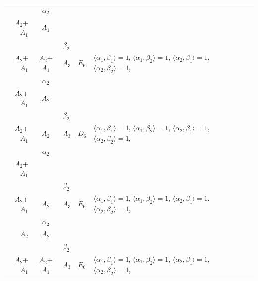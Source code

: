 \documentclass[12pt]{report}
\begin{document}
\begin{appendix}
{\begin{longtable}{rcl p{1cm}p{1cm}p{3cm} }
\\
\begin{tabular}{cc}$\alpha_1$+ & $\alpha_2$\\\tiny{ $A_2$+$A_1$ } & \tiny{ $A_1$ }\end{tabular} &\begin{tabular}{c} = \\~ \end{tabular} & \begin{tabular}{cc}$\beta_1$+ & $\beta_2$\\\tiny{ $A_2$+$A_1$ } & \tiny{ $A_2$+$A_1$ }\end{tabular} & $A_3$ & $E_6$ &  $\langle\alpha_1, \beta_1\rangle=1$, $\langle\alpha_1, \beta_2\rangle=1$, $\langle\alpha_2, \beta_1\rangle=1$, $\langle\alpha_2, \beta_2\rangle=1$, 
\\
\begin{tabular}{cc}$\alpha_1$+ & $\alpha_2$\\\tiny{ $A_2$+$A_1$ } & \tiny{ $A_2$ }\end{tabular} &\begin{tabular}{c} = \\~ \end{tabular} & \begin{tabular}{cc}$\beta_1$+ & $\beta_2$\\\tiny{ $A_2$+$A_1$ } & \tiny{ $A_2$ }\end{tabular} & $A_3$ & $D_6$ &  $\langle\alpha_1, \beta_1\rangle=1$, $\langle\alpha_1, \beta_2\rangle=1$, $\langle\alpha_2, \beta_1\rangle=1$, $\langle\alpha_2, \beta_2\rangle=1$, 
\\
\begin{tabular}{cc}$\alpha_1$+ & $\alpha_2$\\\tiny{ $A_2$+$A_1$ } & \tiny{  }\end{tabular} &\begin{tabular}{c} = \\~ \end{tabular} & \begin{tabular}{cc}$\beta_1$+ & $\beta_2$\\\tiny{ $A_2$+$A_1$ } & \tiny{ $A_2$ }\end{tabular} & $A_3$ & $E_6$ &  $\langle\alpha_1, \beta_1\rangle=1$, $\langle\alpha_1, \beta_2\rangle=1$, $\langle\alpha_2, \beta_1\rangle=1$, $\langle\alpha_2, \beta_2\rangle=1$, 
\\
\begin{tabular}{cc}$\alpha_1$+ & $\alpha_2$\\\tiny{ $A_2$ } & \tiny{ $A_2$ }\end{tabular} &\begin{tabular}{c} = \\~ \end{tabular} & \begin{tabular}{cc}$\beta_1$+ & $\beta_2$\\\tiny{ $A_2$+$A_1$ } & \tiny{ $A_2$+$A_1$ }\end{tabular} & $A_3$ & $E_6$ &  $\langle\alpha_1, \beta_1\rangle=1$, $\langle\alpha_1, \beta_2\rangle=1$, $\langle\alpha_2, \beta_1\rangle=1$, $\langle\alpha_2, \beta_2\rangle=1$, 

\end{longtable}}
\end{appendix}
\end{document}
